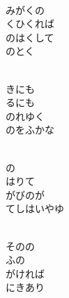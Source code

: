 \documentclass[10pt,b5j]{tarticle} %
\begin{document}
\vspace{1.5em} %
\newcommand{\linespace}{0.5em} %
\newcommand{\blocksize}{0.5\hsize} %
\newcommand{\itemmargin}{6em} %
\begin{enumerate} %
    \setlength{\itemindent}{\itemmargin} %
    \begin{minipage}[c]{\blocksize}
    
        \vspace{\linespace}
        \item~\\
        みがくの\\
        くひくれば\\
        のはくして\\
        のとく
        
        \vspace{\linespace}
        \item~\\
        きにも\\
        るにも\\
        のれゆく\\
        のをふかな
        
        \vspace{\linespace}
        \item~\\
        の\\
        はりて\\
        がびのが\\
        てしはいやゆ
        
        \vspace{\linespace}
        \item~\\
        そのの\\
        ふの\\
        がければ\\
        にきあり
        

\end{minipage}
\end{enumerate}
\end{document}
